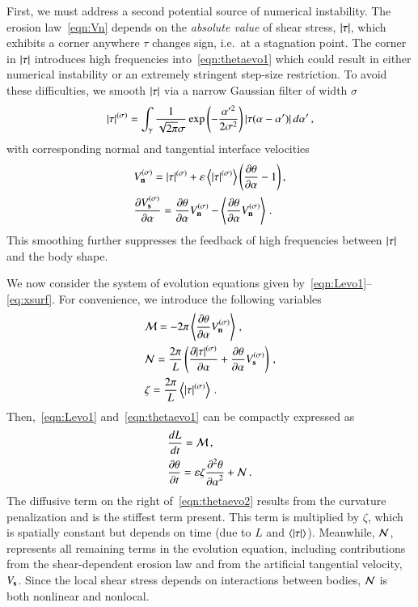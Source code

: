 \documentclass[preprint, 10pt]{elsarticle}
\begin{document}
First, we must address a second potential source of numerical instability. The erosion law~\eqref{eqn:Vn} depends on the {\em absolute value} of shear stress, $\lvert \tau \rvert$, which exhibits a corner anywhere $\tau$ changes sign, i.e.~at a stagnation point. The corner in $\lvert \tau \rvert$ introduces high frequencies into~\eqref{eqn:thetaevo1} which could result in either numerical instability or an extremely stringent step-size restriction. To avoid these difficulties, we smooth $\lvert \tau \rvert$ via a narrow Gaussian filter of width $\sigma$
\begin{align}
\lvert \tau \rvert^{(\sigma)} = \int_{\gamma} \frac{1}{\sqrt{2\pi} \sigma}
 \exp \left(- \frac{\alpha'^2}{2 \sigma^2}\right) \lvert  \tau(\alpha - \alpha')  \rvert \, d\alpha' \, ,
\end{align}
with corresponding normal and tangential interface velocities
\begin{align}
& V_{\mathbf{n}}^{(\sigma)} = \lvert \tau \rvert^{(\sigma)} +  \varepsilon \left< \lvert \tau \rvert^{(\sigma)} \right>
\left(\frac{\partial \theta}{\partial \alpha} - 1 \right), \\
& \frac{\partial V_{\mathbf{s}}^{(\sigma)}}{\partial \alpha} = \frac{\partial \theta}{\partial \alpha} V_{\mathbf{n}}^{(\sigma)} - \left< \frac{\partial \theta}{\partial \alpha} V_{\mathbf{n}}^{(\sigma)} \right> \, .
\end{align}
This smoothing further suppresses the feedback of high frequencies between $\lvert \tau \rvert$ and the body shape.

We now consider the system of evolution equations given by~\eqref{eqn:Levo1}--\eqref{eq:xsurf}. For convenience, we introduce the following variables
\begin{align}
& \mathcal{M} = - 2 \pi \left< \frac{\partial \theta}{\partial \alpha} V_{\mathbf{n}}^{(\sigma)} \right> \, , \\
& \mathcal{N} = \frac{2 \pi}{L} \left( \frac{\partial \lvert \tau \rvert^{(\sigma)}}{\partial \alpha} + \frac{\partial \theta}{\partial \alpha}
V_{\mathbf{s}}^{(\sigma)} \right) \, , \\
& \zeta = \frac{2 \pi}{L}  \left< \lvert \tau \rvert^{(\sigma)} \right> \, .
\end{align}
Then,~\eqref{eqn:Levo1} and~\eqref{eqn:thetaevo1} can be compactly expressed as
\begin{align}
\label{eqn:Levo2}
& \frac{d L}{d t} = \mathcal{M} \, , \\
\label{eqn:thetaevo2}
& \frac{\partial \theta}{\partial t} = \varepsilon \zeta \frac{\partial^2 \theta}{{\partial \alpha}^2} + \mathcal{N} \,.
\end{align}
The diffusive term on the right of~\eqref{eqn:thetaevo2} results from the curvature penalization and is the stiffest term present. This term is multiplied by $\zeta$, which is spatially constant but depends on time (due to $L$ and $\left< \lvert \tau \rvert \right>$). Meanwhile, $\mathcal{N}$, represents all remaining terms in the evolution equation, including contributions from the shear-dependent erosion law and from the artificial tangential velocity, $V_{\mathbf{s}}$. Since the local shear stress depends on interactions between bodies, $\mathcal{N}$ is both nonlinear and nonlocal.
\end{document}
